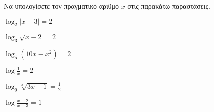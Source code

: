 Να υπολογίσετε τον πραγματικό αριθμό $ x $ στις παρακάτω παραστάσεις.
\begin{multicols}{2}
\begin{rlist}[leftmargin=1mm]
\item $ \log_{2}{|x-3|}=2 $
\item $ \log_{3}{\sqrt{x-2}}=2 $
\item $ \log_{5}{\left(10x-x^2\right) }=2 $
\item $ \log{\frac{1}{x}}=2 $
\item $ \log_{9}{\sqrt[3]{3x-1}}=\frac{1}{2} $
\item $ \log{\frac{x-2}{x+3}}=1 $
\end{rlist}
\end{multicols}
